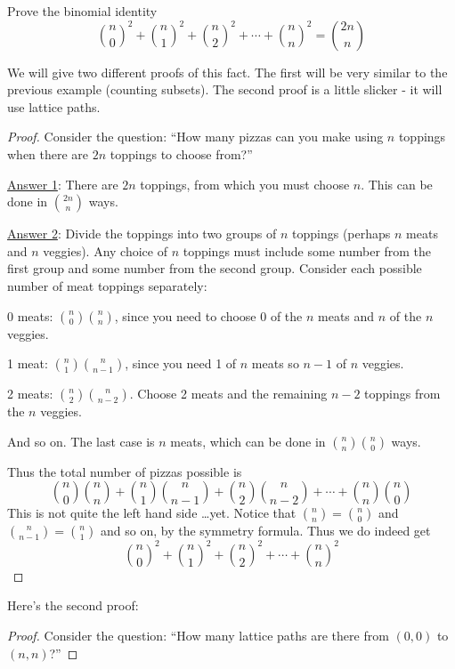 \documentclass[12pt]{article}
\begin{document}
\begin{example}
  Prove the binomial identity
  \[{n \choose 0}^2 + {n \choose 1}^2 + {n \choose 2}^2 + \cdots + {n \choose n}^2 = {2n \choose n}\]
  \begin{solution}
    We will give two different proofs of this fact.  The first will be very similar to the previous example (counting subsets).  The second proof is a little slicker - it will use lattice paths.
    
    \begin{proof}
      Consider the question: ``How many pizzas can you make using $n$ toppings when there are $2n$ toppings to choose from?''
      
      \underline{Answer 1}:  There are $2n$ toppings, from which you must choose $n$.  This can be done in ${2n \choose n}$ ways.
      
      \underline{Answer 2}: Divide the toppings into two groups of $n$ toppings (perhaps $n$ meats and $n$ veggies).  Any choice of $n$ toppings must include some number from the first group and some number from the second group.  Consider each possible number of meat toppings separately:
      
      0 meats: ${n \choose 0}{n \choose n}$, since you need to choose 0 of the $n$ meats and $n$ of the $n$ veggies.
      
      1 meat: ${n \choose 1}{n \choose n-1}$, since you need 1 of $n$ meats so $n-1$ of $n$ veggies.
      
      2 meats: ${n \choose 2}{n \choose n-2}$.  Choose 2 meats and the remaining $n-2$ toppings from the $n$ veggies.
      
      And so on.  The last case is $n$ meats, which can be done in ${n \choose n}{n \choose 0}$ ways.
      
      Thus the total number of pizzas possible is
      \[{n \choose 0}{n \choose n} + {n \choose 1}{n \choose n-1} + {n \choose 2}{n \choose n-2} + \cdots + {n \choose n}{n \choose 0}\]
      This is not quite the left hand side \ldots yet.  Notice that ${n \choose n} = {n \choose 0}$ and ${n \choose n-1} = {n  \choose 1}$ and so on, by the symmetry formula.  Thus we do indeed get
      \[{n \choose 0}^2 + {n \choose 1}^2 + {n \choose 2}^2 + \cdots + {n \choose n}^2\]      
    \end{proof}
    
    Here's the second proof:
    
    \begin{proof}
      Consider the question: ``How many lattice paths are there from $(0,0)$ to $(n,n)$?''
      

\end{proof}
\end{solution}
\end{example}
\end{document}
